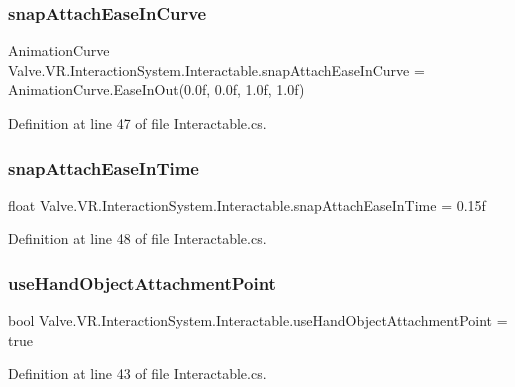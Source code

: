 \subsubsection{\texorpdfstring{snapAttachEaseInCurve}{snapAttachEaseInCurve}}
{\footnotesize\ttfamily Animation\+Curve Valve.\+V\+R.\+Interaction\+System.\+Interactable.\+snap\+Attach\+Ease\+In\+Curve = Animation\+Curve.\+Ease\+In\+Out(0.\+0f, 0.\+0f, 1.\+0f, 1.\+0f)}



Definition at line 47 of file Interactable.\+cs.

\mbox{\label{class_valve_1_1_v_r_1_1_interaction_system_1_1_interactable_a811959ba2752dab29cd5e8b0307fc6ff}} 
\subsubsection{\texorpdfstring{snapAttachEaseInTime}{snapAttachEaseInTime}}
{\footnotesize\ttfamily float Valve.\+V\+R.\+Interaction\+System.\+Interactable.\+snap\+Attach\+Ease\+In\+Time = 0.\+15f}



Definition at line 48 of file Interactable.\+cs.

\mbox{\label{class_valve_1_1_v_r_1_1_interaction_system_1_1_interactable_adab4955f68b0bee987e47238b4199623}} 
\subsubsection{\texorpdfstring{useHandObjectAttachmentPoint}{useHandObjectAttachmentPoint}}
{\footnotesize\ttfamily bool Valve.\+V\+R.\+Interaction\+System.\+Interactable.\+use\+Hand\+Object\+Attachment\+Point = true}



Definition at line 43 of file Interactable.\+cs.



